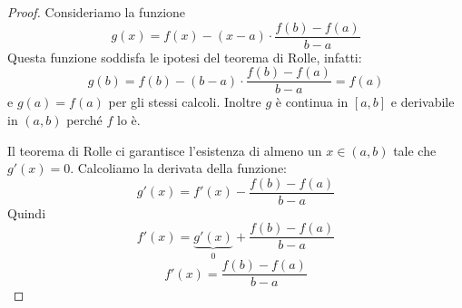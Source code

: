 \begin{proof}
Consideriamo la funzione
\begin{equation*}
g(x) = f(x) - (x-a) \cdot \frac{f(b)-f(a)}{b-a}
\end{equation*}
Questa funzione soddisfa le ipotesi del teorema di Rolle, infatti:
\begin{equation*}
g(b) = f(b) - (b-a) \cdot \frac{f(b)-f(a)}{b-a} = f(a)
\end{equation*} 
e $g(a) = f(a)$ per gli stessi calcoli. Inoltre $g$ è continua in $[a,b]$ e derivabile in $(a,b)$ perché $f$ lo è.

Il teorema di Rolle ci garantisce l'esistenza di almeno un $x \in (a,b)$ tale che $g'(x)=0$. Calcoliamo la derivata della funzione:
\begin{equation*}
g'(x) = f'(x) - \frac{f(b)-f(a)}{b-a}
\end{equation*}
Quindi
\begin{equation*}
f'(x) = \underbrace{g'(x)}_{0} + \frac{f(b)-f(a)}{b-a}
\end{equation*}
\begin{equation*}
f'(x) = \frac{f(b)-f(a)}{b-a}
\end{equation*}
\end{proof}